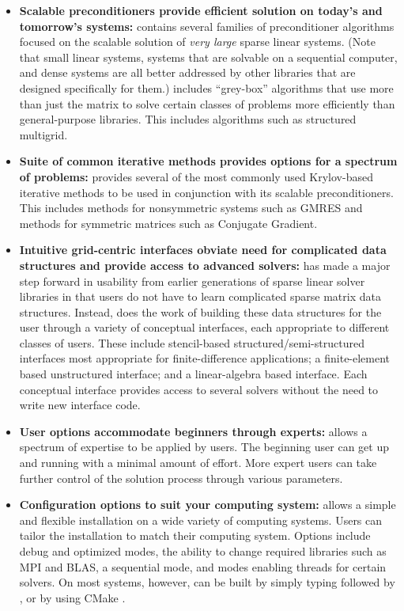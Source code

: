 \begin{itemize}

\item
{\bf Scalable preconditioners provide efficient solution on today's
and tomorrow's systems:} \hypre{} contains several families of
preconditioner algorithms focused on the scalable solution of {\it
very large} sparse linear systems. (Note that small linear systems,
systems that are solvable on a sequential computer, and dense systems
are all better addressed by other libraries that are designed
specifically for them.)
\hypre{} includes ``grey-box'' algorithms
that use more than just the matrix to solve certain classes of
problems more efficiently than general-purpose libraries. This
includes algorithms such as structured multigrid.


\item
{\bf Suite of common iterative methods provides options for a spectrum
of problems:} \hypre{} provides several of the most commonly used
Krylov-based iterative methods to be used in conjunction with its
scalable preconditioners. This includes methods for nonsymmetric
systems such as GMRES and methods for symmetric matrices such as
Conjugate Gradient.

\item
{\bf Intuitive grid-centric interfaces obviate need for complicated
data structures and provide access to advanced solvers:} \hypre{} has
made a major step forward in usability from earlier generations of
sparse linear solver libraries in that users do not have to learn
complicated sparse matrix data structures.  Instead, \hypre{} does the
work of building these data structures for the user through a variety
of conceptual interfaces, each appropriate to different classes of
users.  These include stencil-based structured/semi-structured
interfaces most appropriate for finite-difference applications; a
finite-element based unstructured interface; and a linear-algebra
based interface.  Each conceptual interface provides access to several
solvers without the need to write new interface code.

\item
{\bf User options accommodate beginners through experts:} \hypre{}
allows a spectrum of expertise to be applied by users. The beginning
user can get up and running with a minimal amount of effort. More
expert users can take further control of the solution process through
various parameters.

\item
{\bf Configuration options to suit your computing system:} \hypre{}
allows a simple and flexible installation on a wide variety of
computing systems.  Users can tailor the installation to match their
computing system. Options include debug and optimized modes, the
ability to change required libraries such as MPI and BLAS, a
sequential mode, and modes enabling threads for certain solvers.  On
most systems, however, \hypre{} can be built by simply typing
 followed by , or by using CMake \cite{CMakeWebPage}.


\end{itemize}
